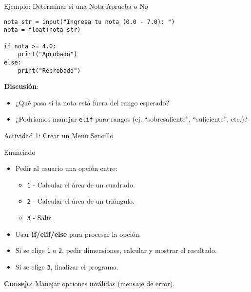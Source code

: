 \documentclass[10pt]{beamer}
\begin{document}
\begin{frame}[fragile]{Ejemplo: Determinar si una Nota Aprueba o No}
\begin{verbatim}
nota_str = input("Ingresa tu nota (0.0 - 7.0): ")
nota = float(nota_str)

if nota >= 4.0:
    print("Aprobado")
else:
    print("Reprobado")
\end{verbatim}
\textbf{Discusión}:
\begin{itemize}
  \item ¿Qué pasa si la nota está fuera del rango esperado?
  \item ¿Podríamos manejar \texttt{elif} para rangos (ej. “sobresaliente”, “suficiente”, etc.)?
\end{itemize}
\end{frame}

\begin{frame}{Actividad 1: Crear un Menú Sencillo}
  \begin{block}{Enunciado}
    \begin{itemize}
      \item Pedir al usuario una opción entre:
        \begin{itemize}
          \item \texttt{1} - Calcular el área de un cuadrado.
          \item \texttt{2} - Calcular el área de un triángulo.
          \item \texttt{3} - Salir.
        \end{itemize}
      \item Usar \textbf{if/elif/else} para procesar la opción.
      \item Si se elige \texttt{1} o \texttt{2}, pedir dimensiones, calcular y mostrar el resultado.
      \item Si se elige \texttt{3}, finalizar el programa.
    \end{itemize}
  \end{block}
  \textbf{Consejo}: Manejar opciones inválidas (mensaje de error).
\end{frame}
\end{document}
